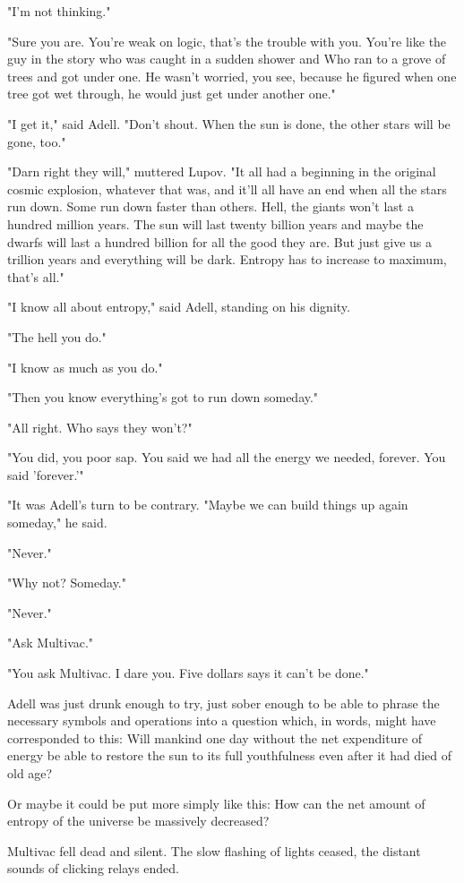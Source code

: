 \documentclass[11pt,twocolumn,paper=a5,pagesize]{article}
\begin{document}
"I'm not thinking."

"Sure you are. You're weak on logic, that's the trouble with you. You're like the guy in the story who was caught in a sudden shower and Who ran to a grove of trees and got under one. He wasn't worried, you see, because he figured when one tree got wet through, he would just get under another one."

"I get it," said Adell. "Don't shout. When the sun is done, the other stars will be gone, too."

"Darn right they will," muttered Lupov. "It all had a beginning in the original cosmic explosion, whatever that was, and it'll all have an end when all the stars run down. Some run down faster than others. Hell, the giants won't last a hundred million years. The sun will last twenty billion years and maybe the dwarfs will last a hundred billion for all the good they are. But just give us a trillion years and everything will be dark. Entropy has to increase to maximum, that's all."

"I know all about entropy," said Adell, standing on his dignity.

"The hell you do."

"I know as much as you do."

"Then you know everything's got to run down someday."

"All right. Who says they won't?"

"You did, you poor sap. You said we had all the energy we needed, forever. You said 'forever.'"

"It was Adell's turn to be contrary. "Maybe we can build things up again someday," he said.

"Never."

"Why not? Someday."

"Never."

"Ask Multivac."

"You ask Multivac. I dare you. Five dollars says it can't be done."

Adell was just drunk enough to try, just sober enough to be able to phrase the necessary symbols and operations into a question which, in words, might have corresponded to this: Will mankind one day without the net expenditure of energy be able to restore the sun to its full youthfulness even after it had died of old age?

Or maybe it could be put more simply like this: How can the net amount of entropy of the universe be massively decreased?

Multivac fell dead and silent. The slow flashing of lights ceased, the distant sounds of clicking relays ended.
\end{document}
